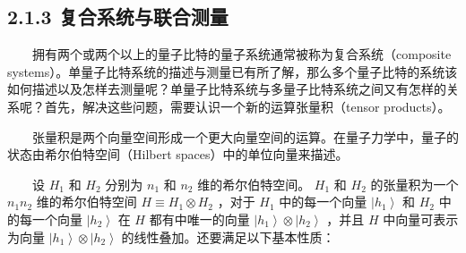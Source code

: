 \documentclass[a4paper,11pt,english]{sphinxmanual}
\begin{document}
\subsection{2.1.3 复合系统与联合测量}
\label{\detokenize{rst/2.1_u91cf_u5b50_u529b_u5b66_u7406_u8bba_u57fa_u7840:id4}}
\sphinxAtStartPar
  拥有两个或两个以上的量子比特的量子系统通常被称为复合系统（composite systems）。单量子比特系统的描述与测量已有所了解，那么多个量子比特的系统该如何描述以及怎样去测量呢？单量子比特系统与多量子比特系统之间又有怎样的关系呢？首先，解决这些问题，需要认识一个新的运算\sphinxhyphen{}张量积（tensor products）。

\sphinxAtStartPar
{}

\sphinxAtStartPar
  张量积是两个向量空间形成一个更大向量空间的运算。在量子力学中，量子的状态由希尔伯特空间（Hilbert spaces）中的单位向量来描述。

\sphinxAtStartPar
  设 \(H_1\) 和 \(H_2\) 分别为 \(n_1\) 和 \(n_2\) 维的希尔伯特空间。 \(H_1\) 和 \(H_2\) 的张量积为一个 \(n_{1} n_{2}\) 维的希尔伯特空间 \(H \equiv H_{1} \otimes H_{2}\) ，对于 \(H_1\) 中的每一个向量 \(\left|h_{1}\right\rangle\) 和 \(H_2\) 中的每一个向量 \(\left|h_{2}\right\rangle\) 在 \(H\) 都有中唯一的向量 \(\left|h_{1}\right\rangle \otimes\left|h_{2}\right\rangle\) ，并且 \(H\) 中向量可表示为向量 \(\left|h_{1}\right\rangle \otimes\left|h_{2}\right\rangle\) 的线性叠加。还要满足以下基本性质：
\end{document}
